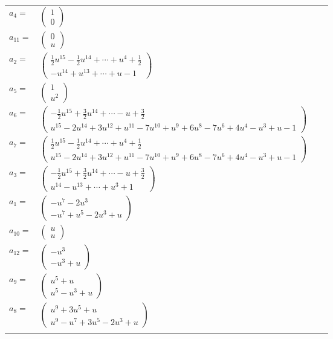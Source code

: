 \documentclass[1p]{elsarticle_modified}
\theoremstyle{definition}
\begin{document}
\begin{tabular}{m{7pt} m{180pt} m{7pt} m{180pt} }
\flushright $a_{4}=$&$\begin{pmatrix}1\\0\end{pmatrix}$ \\
\flushright $a_{11}=$&$\begin{pmatrix}0\\u\end{pmatrix}$ \\
\flushright $a_{2}=$&$\begin{pmatrix}\frac{1}{2} u^{15}-\frac{1}{2} u^{14}+\cdots+u^4+\frac{1}{2}\\- u^{14}+u^{13}+\cdots+u-1\end{pmatrix}$ \\
\flushright $a_{5}=$&$\begin{pmatrix}1\\u^2\end{pmatrix}$ \\
\flushright $a_{6}=$&$\begin{pmatrix}-\frac{1}{2} u^{15}+\frac{3}{2} u^{14}+\cdots- u+\frac{3}{2}\\u^{15}-2 u^{14}+3 u^{12}+u^{11}-7 u^{10}+u^9+6 u^8-7 u^6+4 u^4- u^3+u-1\end{pmatrix}$ \\
\flushright $a_{7}=$&$\begin{pmatrix}\frac{1}{2} u^{15}-\frac{1}{2} u^{14}+\cdots+u^4+\frac{1}{2}\\u^{15}-2 u^{14}+3 u^{12}+u^{11}-7 u^{10}+u^9+6 u^8-7 u^6+4 u^4- u^3+u-1\end{pmatrix}$ \\
\flushright $a_{3}=$&$\begin{pmatrix}-\frac{1}{2} u^{15}+\frac{3}{2} u^{14}+\cdots- u+\frac{3}{2}\\u^{14}- u^{13}+\cdots+u^3+1\end{pmatrix}$ \\
\flushright $a_{1}=$&$\begin{pmatrix}- u^7-2 u^3\\- u^7+u^5-2 u^3+u\end{pmatrix}$ \\
\flushright $a_{10}=$&$\begin{pmatrix}u\\u\end{pmatrix}$ \\
\flushright $a_{12}=$&$\begin{pmatrix}- u^3\\- u^3+u\end{pmatrix}$ \\
\flushright $a_{9}=$&$\begin{pmatrix}u^5+u\\u^5- u^3+u\end{pmatrix}$ \\
\flushright $a_{8}=$&$\begin{pmatrix}u^9+3 u^5+u\\u^9- u^7+3 u^5-2 u^3+u\end{pmatrix}$\\&\end{tabular}
\end{document}
